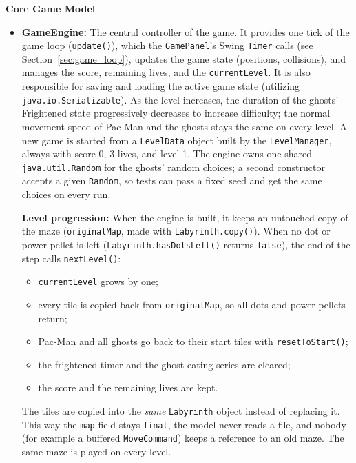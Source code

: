 \documentclass[11pt, a4paper]{article}
\begin{document}
\textbf{Core Game Model}
\begin{itemize}
    \item \textbf{GameEngine:} The central controller of the game. It provides one tick of the game loop (\texttt{update()}), which the \texttt{GamePanel}'s Swing \texttt{Timer} calls (see Section~\ref{sec:game_loop}), updates the game state (positions, collisions), and manages the score, remaining lives, and the \texttt{currentLevel}. It is also responsible for saving and loading the active game state (utilizing \texttt{java.io.Serializable}). As the level increases, the duration of the ghosts' Frightened state progressively decreases to increase difficulty; the normal movement speed of Pac-Man and the ghosts stays the same on every level. A new game is started from a \texttt{LevelData} object built by the \texttt{LevelManager}, always with score 0, 3 lives, and level 1. The engine owns one shared \texttt{java.util.Random} for the ghosts' random choices; a second constructor accepts a given \texttt{Random}, so tests can pass a fixed seed and get the same choices on every run.

    \textbf{Level progression:} When the engine is built, it keeps an untouched copy of the maze (\texttt{originalMap}, made with \texttt{Labyrinth.copy()}). When no dot or power pellet is left (\texttt{Labyrinth.hasDotsLeft()} returns \texttt{false}), the end of the step calls \texttt{nextLevel()}:
    \begin{itemize}
        \item \texttt{currentLevel} grows by one;
        \item every tile is copied back from \texttt{originalMap}, so all dots and power pellets return;
        \item Pac-Man and all ghosts go back to their start tiles with \texttt{resetToStart()};
        \item the frightened timer and the ghost-eating series are cleared;
        \item the score and the remaining lives are kept.
    \end{itemize}
    The tiles are copied into the \textit{same} \texttt{Labyrinth} object instead of replacing it. This way the \texttt{map} field stays \texttt{final}, the model never reads a file, and nobody (for example a buffered \texttt{MoveCommand}) keeps a reference to an old maze. The same maze is played on every level.


\end{itemize}
\end{document}
